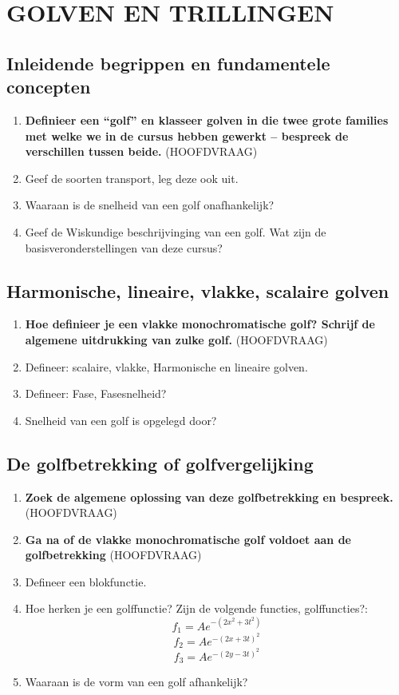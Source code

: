 \documentclass[a4paper,12pt]{article}
\begin{document}
    \maketitle

    \section{GOLVEN EN TRILLINGEN}
    \subsection{Inleidende begrippen en fundamentele concepten}
    \begin{enumerate}
        \item \textbf{Definieer een “golf” en klasseer golven in die twee grote families met welke we in de cursus hebben gewerkt – bespreek de verschillen tussen beide.} (HOOFDVRAAG)
        \item Geef de soorten transport, leg deze ook uit.
        \item Waaraan is de snelheid van een golf onafhankelijk?
        \item Geef de Wiskundige beschrijvinging van een golf. Wat zijn de basisveronderstellingen van deze cursus?
    \end{enumerate}
    \subsection{Harmonische, lineaire, vlakke, scalaire golven}
    \begin{enumerate}
        \item \textbf{Hoe definieer je een vlakke monochromatische golf? Schrijf de algemene uitdrukking van zulke golf.} (HOOFDVRAAG)
        \item Defineer: scalaire, vlakke, Harmonische en lineaire golven.
        \item Defineer: Fase, Fasesnelheid?
        \item Snelheid van een golf is opgelegd door?
    \end{enumerate}
    \subsection{De golfbetrekking of golfvergelijking}
    \begin{enumerate}
        \item \textbf{Zoek de algemene oplossing van deze golfbetrekking en bespreek. } (HOOFDVRAAG)
        \item \textbf{Ga na of de vlakke monochromatische golf voldoet aan de golfbetrekking} (HOOFDVRAAG)
        \item Defineer een blokfunctie.
        \item Hoe herken je een golffunctie? Zijn de volgende functies, golffuncties?: 
        $$f_1 = Ae^{-(2x^2+3t^2)}$$ 
        $$f_2 = Ae^{-(2x+3t)^2}$$ 
        $$f_3 = Ae^{-(2y-3t)^2}$$
        \item Waaraan is de vorm van een golf afhankelijk?
    \end{enumerate}
\end{document}
